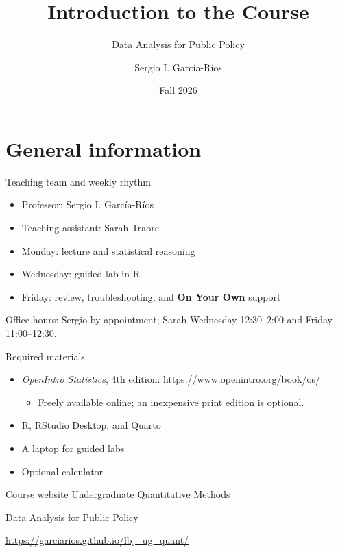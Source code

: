 \documentclass[11pt,aspectratio=169]{beamer}
\author{Sergio I. Garc\'ia-R\'ios}
\title{Introduction to the Course}
\subtitle{Data Analysis for Public Policy}
\institute{PA 311N: Undergraduate Quantitative Methods\\LBJ School of Public Affairs}
\date{Fall 2026}
\begin{document}
\maketitle

\section{General information}

\begin{frame}{Teaching team and weekly rhythm}
\begin{itemize}
  \item Professor: Sergio I. Garc\'ia-R\'ios
  \item Teaching assistant: Sarah Traore
  \item Monday: lecture and statistical reasoning
  \item Wednesday: guided lab in R
  \item Friday: review, troubleshooting, and \textbf{On Your Own} support
\end{itemize}
\vspace{0.4em}
\alert{Office hours:} Sergio by appointment; Sarah Wednesday 12:30--2:00 and Friday 11:00--12:30.
\end{frame}

\begin{frame}{Required materials}
\begin{itemize}
  \item \textit{OpenIntro Statistics}, 4th edition: \url{https://www.openintro.org/book/os/}
  \begin{itemize}
    \item Freely available online; an inexpensive print edition is optional.
  \end{itemize}
  \item R, RStudio Desktop, and Quarto
  \item A laptop for guided labs
  \item Optional calculator
\end{itemize}
\end{frame}

\begin{frame}{Course website}
\centering
{\Large Undergraduate Quantitative Methods}\par
\vspace{0.4em}
{\large Data Analysis for Public Policy}\par
\vspace{0.8em}
\url{https://garciarios.github.io/lbj_ug_quant/}
\end{frame}
\end{document}
